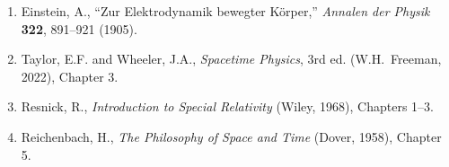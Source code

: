 \begin{enumerate}
\item Einstein, A., ``Zur Elektrodynamik bewegter K\"orper,'' \textit{Annalen der Physik} \textbf{322}, 891--921 (1905).
\item Taylor, E.F. and Wheeler, J.A., \textit{Spacetime Physics}, 3rd ed. (W.H.\ Freeman, 2022), Chapter 3.
\item Resnick, R., \textit{Introduction to Special Relativity} (Wiley, 1968), Chapters 1--3.
\item Reichenbach, H., \textit{The Philosophy of Space and Time} (Dover, 1958), Chapter 5.
\end{enumerate}



